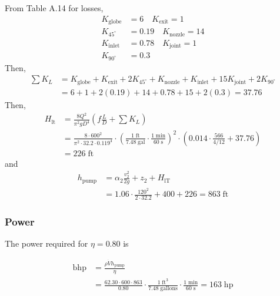 From Table A.14 for losses,
\begin{align*}
    K_{\text{globe}}    & = 6 \quad K_{\text{exit}} = 1       \\
    K_{\text{45}^\circ} & = 0.19 \quad K_{\text{nozzle}} = 14 \\
    K_{\text{inlet}}    & = 0.78 \quad K_{\text{joint}} = 1   \\
    K_{\text{90}^\circ} & = 0.3
\end{align*}
Then,
\begin{align*}
    \sum K_L & = K_{\text{globe}} + K_{\text{exit}} + 2K_{\text{45}^\circ} + K_{\text{nozzle}} + K_{\text{inlet}} + 15K_{\text{joint}} + 2K_{\text{90}^\circ} \\
             & = 6 + 1 + 2(0.19) + 14 + 0.78 + 15 + 2(0.3) = 37.76
\end{align*}
Then,
\begin{align*}
    H_{\text{lt}} & = \frac{8 Q^2}{\pi^2 g D^4} \left(f \frac{L}{D} + \sum K_L\right)                                                                                                                                                          \\
                  & = \frac{8 \cdot 600^2}{\pi^2 \cdot 32.2 \cdot 0.119^4} \cdot \left(\frac{1 \; \text{ft}}{7.48 \; \text{gal}} \cdot \frac{1 \; \text{min}}{60 \; \text{s}}\right)^2 \cdot \left(0.014 \cdot \frac{566}{4/12} + 37.76\right) \\
                  & = 226  \; \text{ft}
\end{align*}
and
\begin{align*}
    h_{\text{pump}} & = \alpha_2 \frac{v_2^2}{2g} + z_2 + H_{\text{lT}}                      \\
                    & = 1.06 \cdot \frac{120^2}{2 \cdot 32.2} + 400 + 226 = 863 \; \text{ft}
\end{align*}

\subsubsection{Power}
The power required for $\eta = 0.80$ is
\begin{framed}
    \begin{align*}
        \text{bhp} & = \frac{\rho \dot{V} h_{\text{pump}}}{\eta}                                                                                                                    \\
                   & = \frac{62.30 \cdot 600 \cdot 863}{0.80} \cdot \frac{1 \; \text{ft}^3}{7.48 \; \text{gallons}} \cdot \frac{1 \; \text{min}}{60 \; \text{s}} = 163 \; \text{hp}
    \end{align*}
\end{framed}

